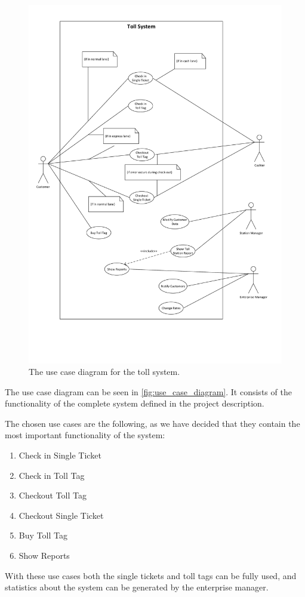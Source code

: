 \begin{figure}
\centering
\includegraphics[width=1\textwidth]{img/use_case_diagram/use_case_diagram}
\vspace{-3cm}
\caption{The use case diagram for the toll system.}
\label{fig:use_case_diagram}
\end{figure}

The use case diagram can be seen in \autoref{fig:use_case_diagram}. It consists of the functionality of the complete system defined in the project description.

The chosen use cases are the following, as we have decided that they contain the most important functionality of the system:
\begin{enumerate}
\item Check in Single Ticket
\item Check in Toll Tag
\item Checkout Toll Tag
\item Checkout Single Ticket
\item Buy Toll Tag
\item Show Reports
\end{enumerate}

With these use cases both the single tickets and toll tags can be fully used, and statistics about the system can be generated by the enterprise manager.

